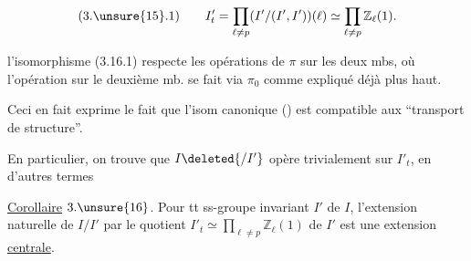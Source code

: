 \[
(3.\unsure{15}.1)\qquad I'_t=\prod_{\ell\ne p}(I'/(I',I'))(\ell)\simeq\prod_{\ell\ne p}\mathbb Z_\ell(1).
\]

 l'isomorphisme  (3.16.1) respecte les opérations de $\pi$ sur les deux mbs, où l'opération sur le deuxième mb.  se fait via $\pi_0$ comme expliqué déjà plus haut.

Ceci en fait exprime le fait que l'isom canonique () est compatible aux ``transport de structure''.

En particulier, on trouve que $I\deleted{/I'}$ opère trivialement sur $I'_t$, en d'autres termes

\uline{Corollaire} $3.\unsure{16}$. Pour tt ss-groupe  invariant $I'$  de $I$, l'extension naturelle de $I/I'$ par le quotient $I'_t\simeq\prod_{\ell\ne p}\mathbb Z_\ell(1)$ de $I'$ est une extension \uline{centrale}.
